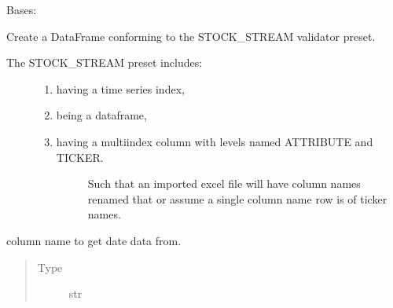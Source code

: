 \documentclass[letterpaper,10pt,english]{sphinxmanual}
\begin{document}
\begin{fulllineitems}
\label{\detokenize{dalio.translator:dalio.translator.file.StockStreamFileTranslator}}
Bases: {\hyperref[\detokenize{dalio.translator:dalio.translator.translator.Translator}]{}}

Create a DataFrame conforming to the STOCK\_STREAM validator preset.
\begin{description}
\item[{The STOCK\_STREAM preset includes:}] \leavevmode\begin{enumerate}
%
\item {} 
having a time series index,

\item {} 
being a dataframe,

\item {} \begin{description}
\item[{having a multiindex column with levels named ATTRIBUTE and TICKER.}] \leavevmode
Such that an imported excel file will have column names renamed
that or assume a single column name row is of ticker names.

\end{description}

\end{enumerate}

\end{description}

\begin{fulllineitems}
\label{\detokenize{dalio.translator:dalio.translator.file.StockStreamFileTranslator.date_col}}
column name to get date data from.
\begin{quote}\begin{description}
\item[{Type}] \leavevmode
str

\end{description}\end{quote}


\end{fulllineitems}
\end{fulllineitems}
\end{document}
